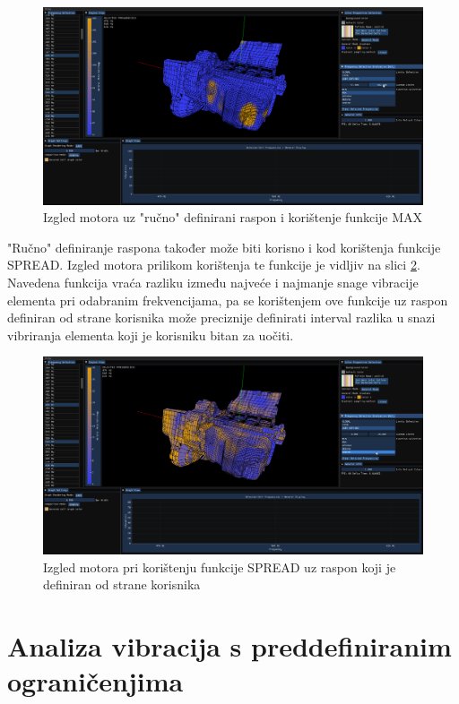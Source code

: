 \documentclass[times, utf8, diplomski]{fer}
\begin{document}
\begin{figure} [H]
	\centering
    \includegraphics[width=\textwidth]{demonstration/custom_limits_linear_sampling.png}
    \caption{Izgled motora uz "ručno" definirani raspon i korištenje funkcije MAX}
    \label{fig:custom-interval}
\end{figure}

"Ručno" definiranje raspona također može biti korisno i kod korištenja funkcije SPREAD. Izgled motora prilikom korištenja te funkcije je vidljiv na slici \ref{fig:spread-view}. Navedena funkcija vraća razliku između najveće i najmanje snage vibracije elementa pri odabranim frekvencijama, pa se korištenjem ove funkcije uz raspon definiran od strane korisnika može preciznije definirati interval razlika u snazi vibriranja elementa koji je korisniku bitan za uočiti. 

\begin{figure} [H]
	\centering
    \includegraphics[width=\textwidth]{demonstration/spread.png}
    \caption{Izgled motora pri korištenju funkcije SPREAD uz raspon koji je definiran od strane korisnika}
    \label{fig:spread-view}
\end{figure}

\section{Analiza vibracija s preddefiniranim ograničenjima}
\end{document}
